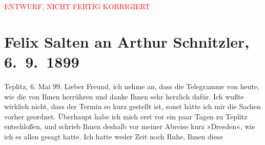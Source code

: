 
\begin{center}
            \textcolor{red}{ENTWURF, NICHT FERTIG KORRIGIERT}
                      \end{center}
            
         \renewcommand{\erwaehnteInstitutionen}{Institutionen: Stadttheater (Teplitz)}
         \renewcommand{\erwaehnteOrte}{Orte: Dresden, Teplice, Wien}
         \renewcommand{\erwaehnteWerke}{}
               \section[Felix Salten an Arthur Schnitzler, 6. 9. 1899]{ Felix Salten an Arthur Schnitzler, 6. 9. 1899}\nopagebreak{}\rehead{ }\begin{ledgroupsized}[t]{13cm}\normalsize\beginnumbering \toendnotes[C]{\smallbreak\pagebreak[2]} 
\toendnotes[C]{\smallbreak}\pstart
           \raggedleft{}{\pb}Teplitz, 6. Mai 99. \pend
           \pstart
           Lieber Freund, ich nehme an, dass die Telegramme von heute, wie die
               \label{K_L03291-11v}\label{K_L03291-11h} von Ihnen
               herrühren und danke Ihnen sehr herzlich dafür. Ich wußte wirklich nicht, dass der
               Termin so kurz gestellt ist, sonst hätte ich mir die Sachen vorher geordnet.
               Überhaupt habe ich mich erst vor ein paar Tagen zu Teplitz entschloßen, und schrieb Ihnen deshalb vor meiner Abreise kurz »Dresden«, wie ich es allen gesagt hatte. Ich hatte
                  {\pb}weder Zeit noch Ruhe, Ihnen
               diese \label{K_L03291-1v}
\end{ledgroupsized}
